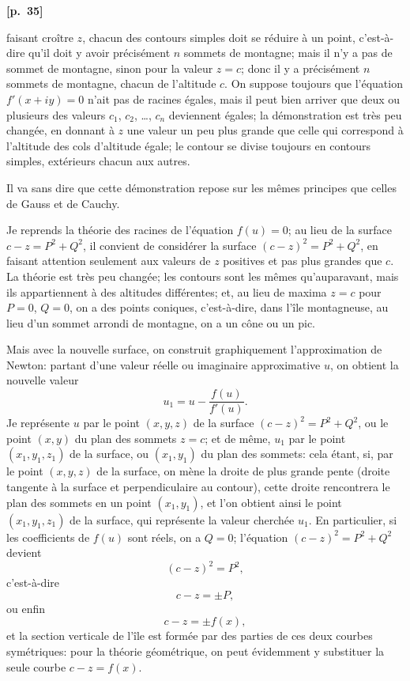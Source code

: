 \documentclass[11pt,a4paper]{article}
\theoremstyle{plain}
\begin{document}
\vspace{0.5em}
\noindent\textbf{[p.\ 35]}

faisant cro\^itre $z$, chacun des contours simples doit se r\'eduire \`a un point, c'est-\`a-dire qu'il doit y avoir pr\'ecis\'ement $n$ sommets de montagne; mais il n'y a pas de sommet de montagne, sinon pour la valeur $z = c$; donc il y a pr\'ecis\'ement $n$ sommets de montagne, chacun de l'altitude $c$. On suppose toujours que l'\'equation $f'(x + iy) = 0$ n'ait pas de racines \'egales, mais il peut bien arriver que deux ou plusieurs des valeurs $c_1$, $c_2$, \ldots, $c_n$ deviennent \'egales; la d\'emonstration est tr\`es peu chang\'ee, en donnant \`a $z$ une valeur un peu plus grande que celle qui correspond \`a l'altitude des cols d'altitude \'egale; le contour se divise toujours en contours simples, ext\'erieurs chacun aux autres.

Il va sans dire que cette d\'emonstration repose sur les m\^emes principes que celles de Gauss et de Cauchy.

Je reprends la th\'eorie des racines de l'\'equation $f(u) = 0$; au lieu de la surface $c - z = P^2 + Q^2$, il convient de consid\'erer la surface $(c - z)^2 = P^2 + Q^2$, en faisant attention seulement aux valeurs de $z$ positives et pas plus grandes que $c$. La th\'eorie est tr\`es peu chang\'ee; les contours sont les m\^emes qu'auparavant, mais ils appartiennent \`a des altitudes diff\'erentes; et, au lieu de maxima $z = c$ pour $P = 0$, $Q = 0$, on a des points coniques, c'est-\`a-dire, dans l'\^ile montagneuse, au lieu d'un sommet arrondi de montagne, on a un c\^one ou un pic.

Mais avec la nouvelle surface, on construit graphiquement l'approximation de Newton: partant d'une valeur r\'eelle ou imaginaire approximative $u$, on obtient la nouvelle valeur
$$
u_1 = u - \frac{f(u)}{f'(u)}.
$$
Je repr\'esente $u$ par le point $(x, y, z)$ de la surface $(c - z)^2 = P^2 + Q^2$, ou le point $(x, y)$ du plan des sommets $z = c$; et de m\^eme, $u_1$ par le point $(x_1, y_1, z_1)$ de la surface, ou $(x_1, y_1)$ du plan des sommets: cela \'etant, si, par le point $(x, y, z)$ de la surface, on m\`ene la droite de plus grande pente (droite tangente \`a la surface et perpendiculaire au contour), cette droite rencontrera le plan des sommets en un point $(x_1, y_1)$, et l'on obtient ainsi le point $(x_1, y_1, z_1)$ de la surface, qui repr\'esente la valeur cherch\'ee $u_1$. En particulier, si les coefficients de $f(u)$ sont r\'eels, on a $Q = 0$; l'\'equation $(c - z)^2 = P^2 + Q^2$ devient
$$
(c - z)^2 = P^2,
$$
c'est-\`a-dire
$$
c - z = \pm P,
$$
ou enfin
$$
c - z = \pm f(x),
$$
et la section verticale de l'\^ile est form\'ee par des parties de ces deux courbes sym\'etriques: pour la th\'eorie g\'eom\'etrique, on peut \'evidemment y substituer la seule courbe $c - z = f(x)$.
\end{document}
